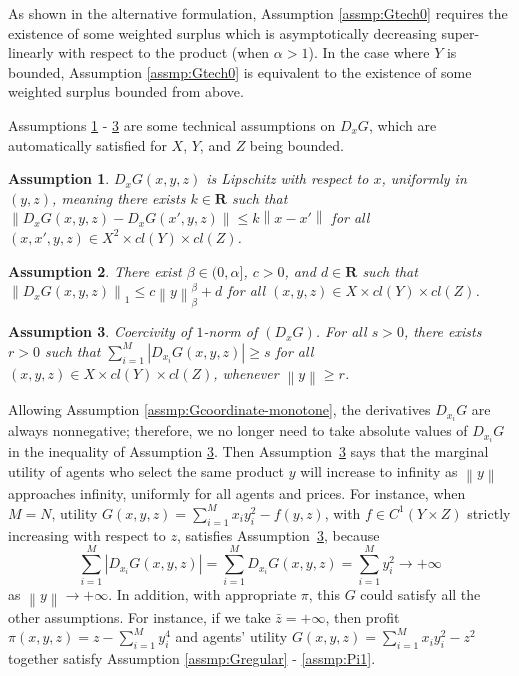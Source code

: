 \documentclass[a4paper, 11pt]{amsart}
\numberwithin{equation}{section}
\theoremstyle{plain}
\newtheorem{assumption}{Assumption}
\theoremstyle{definition}
\theoremstyle{remark}
\newcommand{\R}{\mathbf{R}}
\newcommand{\norm}[1]{\left\lVert#1\right\rVert}
\begin{document}
	
	As shown in the alternative formulation, Assumption \ref{assmp:Gtech0} requires the existence of some weighted surplus which is asymptotically decreasing super-linearly with respect to the product (when $\alpha >1$). In the case where $Y$ is bounded, Assumption \ref{assmp:Gtech0} is equivalent to the existence of some weighted surplus bounded from above.   \medskip






Assumptions \ref{assmp:Gtech1} - \ref{assmp:Gtech3} are some technical assumptions on $D_xG$, which are automatically satisfied for $X$, $Y$, and $Z$ being bounded.\medskip


\begin{assumption}\label{assmp:Gtech1}
	{$D_x G(x,y,z)$ is Lipschitz with respect to $x$},
	uniformly in $(y,z)$, meaning there exists $k\in \R$ such that
	$\norm{D_xG(x,y,z)-D_x G(x',y,z)}\le k\norm{x-x'}$ %
	for all $(x, x',y, z)\in X^2\times cl(Y) \times cl(Z)$.
\end{assumption}


\begin{assumption}\label{assmp:Gtech2}
	 There exist $ \beta \in (0, \alpha]$, $c>0$, and $ d\in \R$ such that $\norm{D_x G(x,y,z)}_{1}\le c\norm{y}_{\beta}^{\beta} +d$ for all $ (x, y, z)\in X\times cl(Y) \times cl(Z)$.
\end{assumption}


\begin{assumption}\label{assmp:Gtech3}
	 Coercivity of {$1$-norm} of $(D_xG)$. For all $ s>0$, there exists $r>0$ such that $\sum_{i=1}^{M} |D_{x_i}G(x,y,z)|\ge s$ for all $(x, y, z)\in X\times  cl(Y) \times cl(Z)$, whenever $\norm{y}\ge r$.
\end{assumption}



{Allowing Assumption \ref{assmp:Gcoordinate-monotone}, {the derivatives $D_{x_i}G$ are always nonnegative; therefore,} we no longer need to take absolute values of $D_{x_i}G$ in the inequality of Assumption \ref{assmp:Gtech3}.} Then Assumption~\ref{assmp:Gtech3} says that the marginal utility of agents who select the same product $y$ will increase to infinity as $\norm{y}$ approaches infinity, uniformly for all agents and prices. {For instance, when $M = N$, utility $G(x,y,z) = \sum_{i=1}^{M} x_iy_i^2 -f(y,z) $, with $f \in C^1(Y \times Z)$ strictly increasing with respect to $z$, satisfies Assumption~\ref{assmp:Gtech3}, because 
	$$\sum_{i=1}^{M} \left|D_{x_i}G(x,y,z)\right| = \sum_{i=1}^{M} D_{x_i}G(x,y,z) = \sum_{i=1}^{M} y_i^2 \rightarrow +\infty$$ 
as $\norm{y} \rightarrow + \infty$. In addition, with appropriate $\pi$, this $G$ could satisfy all the other assumptions. For instance, if we take $\bar{z} = +\infty$, then profit $\pi(x,y,z) = z - \sum_{i=1}^{M} y_i^4$ and agents' utility $G(x,y,z)= \sum_{i=1}^{M} x_iy_i^2 - z^2 $ together satisfy Assumption \ref{assmp:Gregular} -  \ref{assmp:Pi1}.}\medskip
\end{document}
